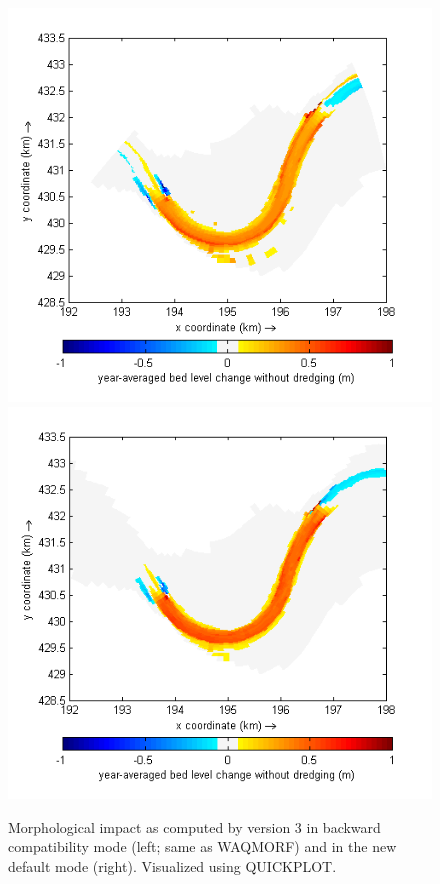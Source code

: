 \begin{figure}[h]
\includegraphics[width=\columnwidth/2]{figures/report_Figure1_QP.png}
\includegraphics[width=\columnwidth/2]{figures/report_Figure1_v3_QP.png}
\caption{Morphological impact as computed by \dfmi version 3 in backward compatibility mode (left; same as WAQMORF) and in the new default mode (right).
Visualized using QUICKPLOT.}
\label{GendtseWaard_diff}
\end{figure}

